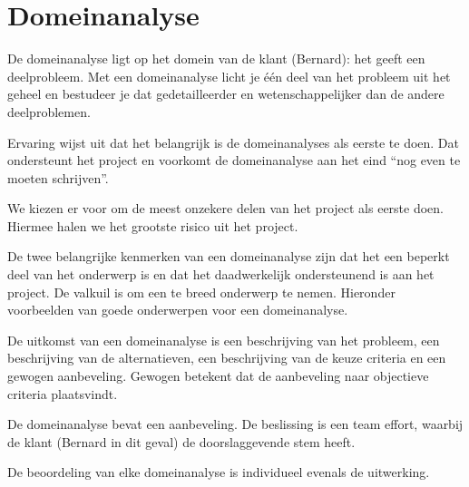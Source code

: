 
\section{Domeinanalyse}

De domeinanalyse ligt op het domein van de klant (Bernard): het geeft een deelprobleem. Met een domeinanalyse licht je
\'e\'en deel van het probleem uit het geheel en bestudeer je dat gedetailleerder en wetenschappelijker dan de andere deelproblemen.

Ervaring wijst uit dat het belangrijk is de domeinanalyses als eerste te doen. Dat ondersteunt het project en voorkomt
de domeinanalyse aan het eind ``nog even te moeten schrijven''.

We kiezen er voor om de meest onzekere delen van het project als eerste doen. Hiermee halen we het grootste risico uit het
project.

De twee belangrijke kenmerken van een domeinanalyse zijn dat het een beperkt deel van het onderwerp is en dat het daadwerkelijk
ondersteunend is aan het project. De valkuil is om een te breed onderwerp te nemen. Hieronder voorbeelden van goede onderwerpen
voor een domeinanalyse.

De uitkomst van een domeinanalyse is een beschrijving van het probleem,
een beschrijving van de alternatieven, een beschrijving van de keuze criteria en
een gewogen aanbeveling. Gewogen betekent dat de aanbeveling naar objectieve criteria plaatsvindt.

De domeinanalyse bevat een aanbeveling. De beslissing is een team effort, waarbij de klant (Bernard in dit geval)
de doorslaggevende stem heeft.

De beoordeling van elke domeinanalyse is individueel evenals de uitwerking.

